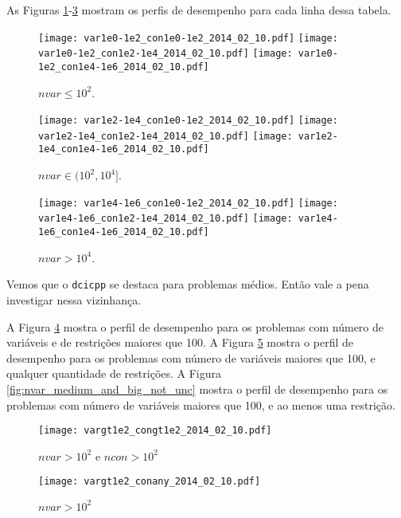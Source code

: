 \documentclass{article}
\begin{document}
As Figuras \ref{fig:nvar_small}-\ref{fig:nvar_big} mostram os perfis de
desempenho para cada linha dessa tabela.

\begin{figure}[H]
\centering
\texttt{[image: var1e0-1e2\_con1e0-1e2\_2014\_02\_10.pdf]}
\texttt{[image: var1e0-1e2\_con1e2-1e4\_2014\_02\_10.pdf]}
\texttt{[image: var1e0-1e2\_con1e4-1e6\_2014\_02\_10.pdf]}
\caption{ $nvar \leq 10^2$. }
\label{fig:nvar_small}
\end{figure}
\begin{figure}[H]
\centering
\texttt{[image: var1e2-1e4\_con1e0-1e2\_2014\_02\_10.pdf]}
\texttt{[image: var1e2-1e4\_con1e2-1e4\_2014\_02\_10.pdf]}
\texttt{[image: var1e2-1e4\_con1e4-1e6\_2014\_02\_10.pdf]}
\caption{ $nvar \in (10^2,10^4]$. }
\label{fig:nvar_medium}
\end{figure}
\begin{figure}[H]
\centering
\texttt{[image: var1e4-1e6\_con1e0-1e2\_2014\_02\_10.pdf]}
\texttt{[image: var1e4-1e6\_con1e2-1e4\_2014\_02\_10.pdf]}
\texttt{[image: var1e4-1e6\_con1e4-1e6\_2014\_02\_10.pdf]}
\caption{ $nvar > 10^4$. }
\label{fig:nvar_big}
\end{figure}

Vemos que o \verb+dcicpp+ se destaca para problemas médios. Então vale a pena
investigar nessa vizinhança.

A Figura \ref{fig:both_medium_and_big} mostra o perfil de desempenho para os
problemas com número de variáveis e de restrições maiores que 100.
A Figura \ref{fig:nvar_medium_and_big} mostra o perfil de desempenho para os
problemas com número de variáveis maiores que 100, e qualquer quantidade de
restrições.
A Figura \ref{fig:nvar_medium_and_big_not_unc} mostra o perfil de desempenho
para os problemas com número de variáveis maiores que 100, e ao menos uma
restrição.

\begin{figure}[H]
\centering
\texttt{[image: vargt1e2\_congt1e2\_2014\_02\_10.pdf]}
\caption{ $nvar > 10^2$ e $ncon > 10^2$ }
\label{fig:both_medium_and_big}
\end{figure}

\begin{figure}[H]
\centering
\texttt{[image: vargt1e2\_conany\_2014\_02\_10.pdf]}
\caption{ $nvar > 10^2$ }
\label{fig:nvar_medium_and_big}
\end{figure}
\end{document}
